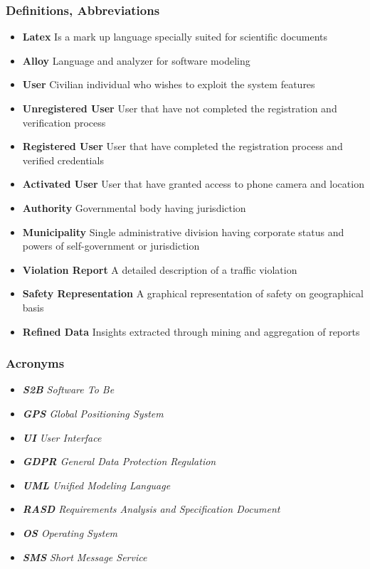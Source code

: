 \subsubsection{Definitions, Abbreviations}
\begin{itemize}
\item[] \textbf{Latex} Is a mark up language specially suited for scientific documents
\item[] \textbf{Alloy} Language and analyzer for software modeling
\item[] \textbf{User} Civilian individual who wishes to exploit the system features
\item[] \textbf{Unregistered User} User that have not completed the registration and verification process
\item[] \textbf{Registered User} User that have completed the registration process and verified credentials
\item[] \textbf{Activated User} User that have granted access to phone camera and location
\item[] \textbf{Authority} Governmental body having jurisdiction
\item[] \textbf{Municipality} Single administrative division having corporate status and powers of self-government or jurisdiction
\item[] \textbf{Violation Report} A detailed description of a traffic violation
\item[] \textbf{Safety Representation} A graphical representation of safety on geographical basis
\item[] \textbf{Refined Data} Insights extracted through mining and aggregation of reports
\end{itemize}

\subsubsection{Acronyms}
\begin{itemize}
\item[] \emph{\textbf{S2B} Software To Be}
\item[] \emph{\textbf{GPS} Global Positioning System}
\item[] \emph{\textbf{UI} User Interface}
\item[] \emph{\textbf{GDPR} General Data Protection Regulation}
\item[] \emph{\textbf{UML} Unified Modeling Language}
\item[] \emph{\textbf{RASD} Requirements Analysis and Specification Document}
\item[] \emph{\textbf{OS} Operating System}
\item[] \emph{\textbf{SMS} Short Message Service}
\end{itemize}